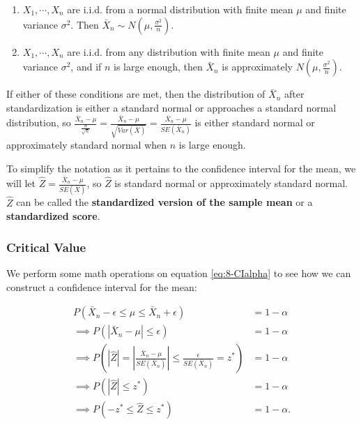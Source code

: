 \documentclass[
]{book}
\begin{document}
\begin{enumerate}
\def\labelenumi{\arabic{enumi}.}
\item
  \(X_1, \cdots, X_n\) are i.i.d. from a normal distribution with finite mean \(\mu\) and finite variance \(\sigma^2\). Then \(\bar{X}_n \sim N(\mu, \frac{\sigma^2}{n})\).
\item
  \(X_1, \cdots, X_n\) are i.i.d. from any distribution with finite mean \(\mu\) and finite variance \(\sigma^2\), and if \(n\) is large enough, then \(\bar{X}_n\) is approximately \(N(\mu, \frac{\sigma^2}{n})\).
\end{enumerate}

If either of these conditions are met, then the distribution of \(\bar{X}_n\) after standardization is either a standard normal or approaches a standard normal distribution, so \(\frac{\bar{X}_n - \mu}{\frac{\sigma}{\sqrt{n}}} = \frac{\bar{X}_n - \mu}{\sqrt{Var(\bar{X})}} = \frac{\bar{X}_n - \mu}{SE(\bar{X}_n)}\) is either standard normal or approximately standard normal when \(n\) is large enough.

To simplify the notation as it pertains to the confidence interval for the mean, we will let \(\hat{Z} = \frac{\bar{X}_n - \mu}{SE(\bar{X})}\), so \(\hat{Z}\) is standard normal or approximately standard normal. \(\hat{Z}\) can be called the \textbf{standardized version of the sample mean} or a \textbf{standardized score}.

\hypertarget{critical-value}{%
\subsubsection{Critical Value}\label{critical-value}}

We perform some math operations on equation \eqref{eq:8-CIalpha} to see how we can construct a confidence interval for the mean:

\begin{equation} 
\begin{split}
P(\bar{X}_n - \epsilon \leq \mu \leq \bar{X}_n + \epsilon) &= 1 - \alpha \\
\implies P(|\bar{X}_n - \mu| \leq \epsilon) &= 1 - \alpha \\
\implies P \left(|\hat{Z}| = |\frac{\bar{X}_n - \mu}{SE(\bar{X}_n)}|  \leq \frac{\epsilon}{SE(\bar{X}_n)} = z^{*} \right) &= 1 - \alpha \\
\implies P(|\hat{Z}| \leq z^{*}) &= 1 - \alpha \\
\implies P(-z^{*} \leq \hat{Z} \leq z^{*}) &= 1 - \alpha.
\end{split}
\label{eq:8-CIcrit}
\end{equation}
\end{document}
